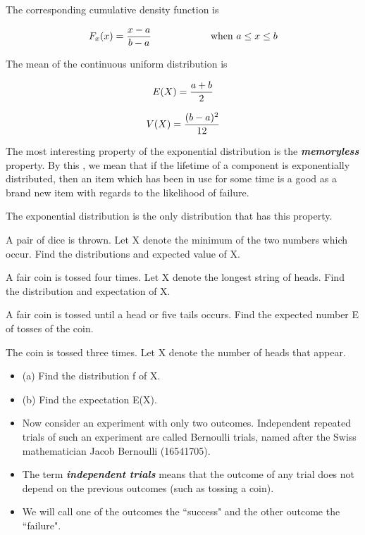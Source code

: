 \documentclass[]{article}
\begin{document}
	The corresponding cumulative density function is
	
	\[ F_x(x) = { x-a \over b-a}   \hspace{2cm}  \mbox{ when } a \leq x \leq b\]
	
	
	The mean of the continuous uniform distribution is
	
	\[ E(X) = {a+b \over 2}\]
	
	\[ V(X) = {(b-a)^2\over12}\]

	The most interesting property of the exponential distribution is the \textbf{\emph{memoryless}} property. By this , we mean that if  the lifetime of a component is exponentially distributed, then an item which has been in use for some time is a good as a brand new item with regards to the likelihood of failure.
	
	The exponential distribution is the only distribution that has this property.

	A pair of dice is thrown. Let X denote the minimum of the two numbers which occur.
	Find the distributions and expected value of X.

	A fair coin is tossed four times.
	Let X denote the longest string of heads.
	Find the distribution and expectation of X.
	
{\Large%
	A fair coin is tossed until a head or five tails occurs.
	Find the expected number E of tosses of the coin.}
{\Large%
	
	The coin is tossed three times. Let X denote the number of
	heads that appear.
	\begin{itemize}
		\item (a) Find the distribution f of X.
		\item (b) Find the expectation E(X).
	\end{itemize}

	\begin{itemize}
		\item Now consider an experiment with only two outcomes. Independent repeated trials of such an experiment are
		called Bernoulli trials, named after the Swiss mathematician Jacob Bernoulli (16541705). \item The term \textbf{\emph{independent
				trials}} means that the outcome of any trial does not depend on the previous outcomes (such as tossing a coin).
		\item We will call one of the outcomes the ``success" and the other outcome the ``failure".
	\end{itemize}
}
\end{document}
